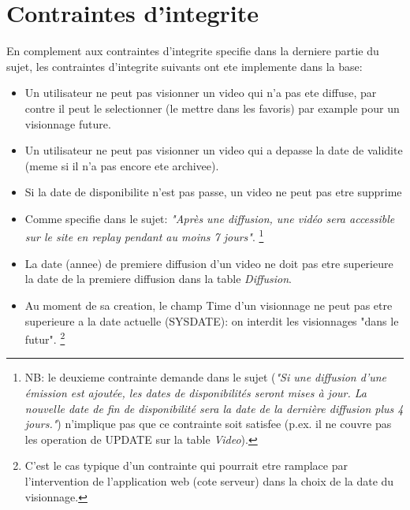 \documentclass[twoside,openright,a4paper,11pt,french]{article}
\begin{document}
\section{Contraintes d'integrite}
En complement aux contraintes d'integrite specifie dans la derniere partie du
sujet, les contraintes d'integrite suivants ont ete implemente dans la base:

\begin{itemize}
\item Un utilisateur ne peut pas visionner un video qui n'a pas ete diffuse,
par contre il peut le selectionner (le mettre dans les favoris) par example
pour un visionnage future.

\item Un utilisateur ne peut pas visionner un video qui a depasse la date de validite
(meme si il n'a pas encore ete archivee).

\item Si la date de disponibilite n'est pas passe, un video ne peut pas etre supprime

\item Comme specifie dans le sujet: {\it "Après une diffusion, une vidéo sera
accessible sur le site en replay pendant au moins 7 jours"}.
\footnote{NB: le deuxieme contrainte demande dans le sujet ({\it"Si une diffusion d’une émission est
ajoutée, les dates de disponibilités seront mises à jour.  La nouvelle date de
fin de disponibilité sera la date de la dernière diffusion plus 4 jours."}) n'implique
pas que ce contrainte soit satisfee (p.ex. il ne couvre pas les operation de UPDATE 
sur la table {\it Video}).}

\item La date (annee) de premiere diffusion d'un video ne doit pas
etre superieure la date de la premiere diffusion dans la table {\it Diffusion}.

\item Au moment de sa creation, le champ Time d'un visionnage ne peut pas etre superieure
a la date actuelle (SYSDATE): on interdit les visionnages "dans le futur".
\footnote{C'est le cas typique d'un contrainte qui pourrait etre ramplace par l'intervention de
l'application web (cote serveur) dans la choix de la date du visionnage.}

\end{itemize}

\end{document}
